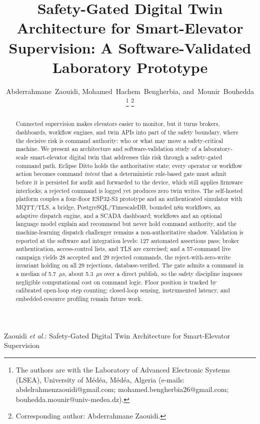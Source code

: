 \documentclass[journal]{IEEEtran}
\begin{document}
\title{Safety-Gated Digital Twin Architecture for Smart-Elevator Supervision: A Software-Validated Laboratory Prototype}

\author{Abderrahmane~Zaouidi,
        Mohamed~Hachem~Bengherbia,
        and~Mounir~Bouhedda%
\thanks{The authors are with the Laboratory of Advanced Electronic Systems (LSEA), University of M\'ed\'ea, M\'ed\'ea, Algeria (e-mails: abdelrahmenzaouidi@gmail.com; mohamed.bengherbia26@gmail.com; bouhedda.mounir@univ-medea.dz).}%
\thanks{Corresponding author: Abderrahmane Zaouidi.}}

%
{Zaouidi \MakeLowercase{\textit{et al.}}: Safety-Gated Digital Twin Architecture for Smart-Elevator Supervision}

\maketitle

\begin{abstract}
Connected supervision makes elevators easier to monitor, but it turns brokers, dashboards, workflow engines, and twin APIs into part of the safety boundary, where the decisive risk is command authority: who or what may move a safety-critical machine. We present an architecture and software-validation study of a laboratory-scale smart-elevator digital twin that addresses this risk through a safety-gated command path. Eclipse Ditto holds the authoritative state; every operator or workflow action becomes command \emph{intent} that a deterministic rule-based gate must admit before it is persisted for audit and forwarded to the device, which still applies firmware interlocks; a rejected command is logged yet produces zero twin writes. The self-hosted platform couples a four-floor ESP32-S3 prototype and an authenticated simulator with MQTT/TLS, a bridge, PostgreSQL/TimescaleDB, bounded n8n workflows, an adaptive dispatch engine, and a SCADA dashboard; workflows and an optional language model explain and recommend but never hold command authority, and the machine-learning dispatch challenger remains a non-authoritative shadow. Validation is reported at the software and integration levels: 127 automated assertions pass; broker authentication, access-control lists, and TLS are exercised; and a 57-command live campaign yields 28 accepted and 29 rejected commands, the reject-with-zero-write invariant holding on all 29 rejections, database-verified. The gate admits a command in a median of 5.7~$\mu$s, about 5.3~$\mu$s over a direct publish, so the safety discipline imposes negligible computational cost on command logic. Floor position is tracked by calibrated open-loop step counting; closed-loop sensing, instrumented latency, and embedded-resource profiling remain future work.
\end{abstract}
\end{document}
